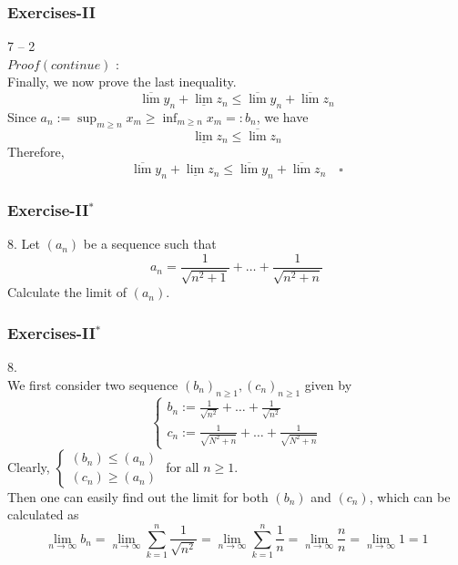 \documentclass[12pt, t]{beamer}
\begin{document}
\begin{frame}
    \frametitle{Exercises-II}
    7 -- 2\\
    $Proof(continue)$ : \\
    \hspace{1em} Finally, we now prove the last inequality.
    \begin{equation*}
        \overline{\lim}y_n+\underline{\lim}z_n\leq\overline{\lim}y_n+\overline{\lim}z_n
    \end{equation*}
    \hspace{1em} Since $a_n:=\sup_{m\geq n}x_m\geq \inf_{m\geq n}x_m=:b_n$, we have
    \begin{equation*}
        \underline{\lim}z_n\leq \overline{\lim}z_n
    \end{equation*}
    \hspace{1em} Therefore,
    \begin{equation*}
        \overline{\lim}y_n+\underline{\lim}z_n\leq\overline{\lim}y_n+\overline{\lim}z_n \quad \square
    \end{equation*}

\end{frame}




\begin{frame}
    \frametitle{Exercise-II$^*$}
    8. Let $(a_n)$ be a sequence such that
    \begin{equation*}
        a_n=\frac{1}{\sqrt{n^2+1}}+\dots+\frac{1}{\sqrt{n^2+n}}
    \end{equation*}
    Calculate the limit of $(a_n)$.
\end{frame}

\begin{frame}
    \frametitle{Exercises-II$^*$}
    8.\\
    \hspace{1em} We first consider two sequence $(b_n)_{n\geq 1},(c_n)_{n\geq 1}$ given by
    \begin{equation*}
        \begin{cases}
            b_n:=\frac{1}{\sqrt{n^2}}+\dots+\frac{1}{\sqrt{n^2}} \\
            c_n:=\frac{1}{\sqrt{N^2+n}}+\dots+\frac{1}{\sqrt{N^2+n}}
        \end{cases}
    \end{equation*}
    \hspace{1em} Clearly,
    $\begin{cases}
            (b_n)\leq (a_n) \\
            (c_n)\geq (a_n)
        \end{cases}$
    for all $n\geq 1$. \\
    \hspace{1em} Then one can easily find out the limit for both $(b_n)$ and $(c_n)$, which can be calculated as
    \begin{equation*}
        \lim_{n\rightarrow\infty}b_n=\lim_{n\rightarrow \infty}\sum^n_{k=1}\frac{1}{\sqrt{n^2}}=\lim_{n\rightarrow \infty}\sum^n_{k=1}\frac{1}{n}=\lim_{n\rightarrow\infty}\frac{n}{n}=\lim_{n\rightarrow\infty}1=1
    \end{equation*}
\end{frame}
\end{document}
